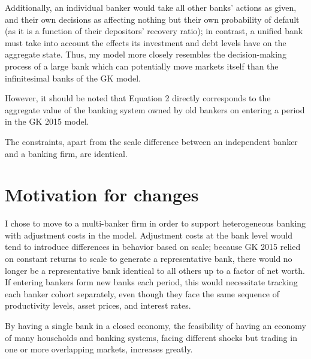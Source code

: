\documentclass[english]{article}
\begin{document}
Additionally, an individual banker would take all other banks' actions as given, and their own decisions 
as affecting nothing but their own probability of default (as it is a function of their depositors' 
recovery ratio); in contrast, a unified bank must take into account the effects its investment and 
debt levels have on the aggregate state. Thus, my model more closely resembles the decision-making 
process of a large bank which can potentially move markets itself than the infinitesimal banks of the 
GK model. 

However, it should be noted that Equation 2 directly corresponds to the aggregate value of the banking 
system owned by old bankers on entering a period in the GK 2015 model. 

The constraints, apart from the scale difference between an independent banker and a banking firm, 
are identical. 

\section{Motivation for changes}
I chose to move to a multi-banker firm in order to support heterogeneous banking with adjustment costs 
in the model. Adjustment costs at the bank level would tend to introduce differences in behavior 
based on scale; because GK 2015 relied on constant returns to scale to generate a representative bank, 
there would no longer be a representative bank identical to all others up to a factor 
of net worth. If entering bankers form new banks each period, this would necessitate tracking each 
banker cohort separately, even though they face the same sequence of productivity levels, asset prices, 
and interest rates. 

By having a single bank in a closed economy, the feasibility of having an economy of many households 
and banking systems, facing different shocks but trading in one or more overlapping markets, increases 
greatly. 
\end{document}
